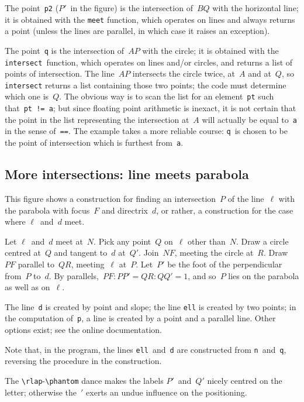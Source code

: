 \documentclass{enkidudoc}
\begin{document}

The point~\texttt{p2} ($P'$~in the figure)
is the intersection of~$BQ$ with the horizontal line;
it is obtained with the \texttt{meet} function, which operates on lines
and always returns a point
(unless the lines are parallel, in which case it raises an exception).

The point~\texttt{q} is the intersection of~$AP$ with the circle;
it is obtained with the \texttt{intersect}~function,
which operates on lines and/or circles,
and returns a list of points of intersection.
The line~$AP$ intersects the circle twice, at~$A$ and at~$Q$,
so \texttt{intersect} returns a list containing those two points;
the code must determine which one is~$Q$.
The obvious way is to scan the list
for an element~\texttt{pt} such that~\texttt{pt != a};
but since floating point arithmetic is inexact,
it is not certain that the point in the list representing
the intersection at~$A$ will actually be equal to~\texttt{a}
in the sense of~\texttt{==}.
The example takes a more reliable course:
\texttt{q}~is chosen to be the point of intersection
which is furthest from~\texttt{a}.

\pagebreak
\subsection{More intersections: line meets parabola}

This figure shows a construction
for finding an intersection~$P$ of the line~$\ell$
with the parabola with focus~$F$ and directrix~$d$,
or rather, a construction for the case where $\ell$~and~$d$ meet.

Let $\ell$~and~$d$ meet at~$N$.
Pick any point~$Q$ on~$\ell$ other than~$N$.
Draw a circle centred at~$Q$ and tangent to~$d$ at~$Q'$.
Join~$NF$, meeting the circle at~$R$.
Draw~$PF$ parallel to~$QR$, meeting~$\ell$ at~$P$.
Let~$P'$ be the foot of the perpendicular from~$P$ to~$d$.
By parallels,~$PF : PP' = QR : QQ' = 1$,
and so~$P$ lies on the parabola as well as on~$\ell$.


The line~\texttt{d} is created by point and slope;
the line \texttt{ell} is created by two points;
in the computation of~\texttt{p}, a line is created
by a point and a parallel line.
Other options exist; see the online documentation.

Note that, in the program, the lines \texttt{ell}~and~\texttt{d}
are constructed from \texttt{n}~and~\texttt{q},
reversing the procedure in the construction.

The \verb:\rlap:-\verb:\phantom: dance makes the labels
$P'$~and~$Q'$ nicely centred on the letter;
otherwise the~$'$ exerts an undue influence on the positioning.
\end{document}
